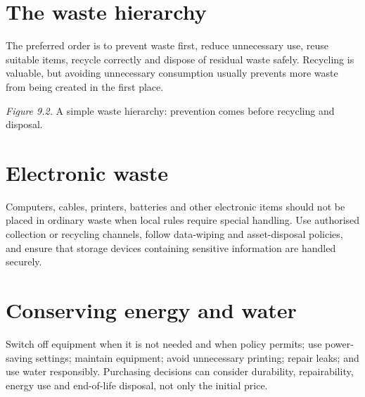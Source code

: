 \documentclass[11pt,openany,oneside]{book}
\begin{document}
\section{The waste hierarchy}
The preferred order is to prevent waste first, reduce unnecessary use, reuse suitable items, recycle correctly and dispose of residual waste safely. Recycling is valuable, but avoiding unnecessary consumption usually prevents more waste from being created in the first place.

\begin{center}
\end{center}
\textit{Figure 9.2.} A simple waste hierarchy: prevention comes before recycling and disposal.

\section{Electronic waste}
Computers, cables, printers, batteries and other electronic items should not be placed in ordinary waste when local rules require special handling. Use authorised collection or recycling channels, follow data-wiping and asset-disposal policies, and ensure that storage devices containing sensitive information are handled securely.

\section{Conserving energy and water}
Switch off equipment when it is not needed and when policy permits; use power-saving settings; maintain equipment; avoid unnecessary printing; repair leaks; and use water responsibly. Purchasing decisions can consider durability, repairability, energy use and end-of-life disposal, not only the initial price.
\end{document}
